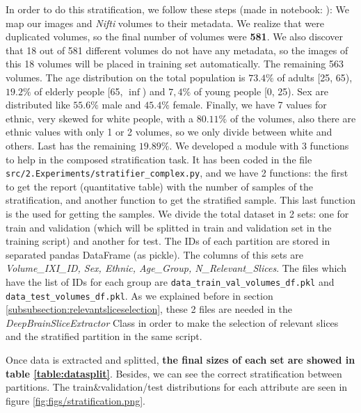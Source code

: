 In order to do this stratification, we follow these steps (made in notebook: ): We map our images and \textit{Nifti} volumes to their metadata. We realize that were duplicated volumes, so the final number of volumes were \textbf{581}. We also discover that 18 out of 581 different volumes do not have any metadata, so the images of this 18 volumes will be placed in training set automatically. The remaining 563 volumes. The age distribution on the total population is $73.4\%$ of adults [25, 65), $19.2\%$ of elderly people [65, $\inf$) and $7,4\%$ of young people [0, 25). Sex are distributed like $55.6\%$ male and $45.4\%$ female. Finally, we have 7 values for ethnic, very skewed for white people, with a $80.11\%$ of the volumes, also there are ethnic values with only 1 or 2 volumes, so we only divide between white and others. Last has the remaining $19.89\%$. We developed a module with 3 functions to help in the composed stratification task. It has been coded in the file \texttt{\-src/\-2.Ex\-perim\-ents\-/strati\-fier\-\_complex.py}, and we have 2 functions: the first to get the report (quantitative table) with the number of samples of the stratification, and another function to get the stratified sample. This last function is the used for getting the samples. We divide the total dataset in 2 sets: one for train and validation (which will be splitted in train and validation set in the training script) and another for test. The IDs of each partition are stored in separated pandas DataFrame (as pickle). The columns of this sets are \textit{Volume\_IXI\_ID, Sex, Ethnic, Age\_Group, N\_Relevant\_Slices}. The files which have the list of IDs for each group are \texttt{data\-\_train\-\_val\-\_volumes\-\_df.pkl} and \texttt{data\-\_test\-\_volumes\-\_df.pkl}. As we explained before in section \ref{subsubsection:relevantsliceselection}, these 2 files are needed in the \textit{DeepBrainSliceExtractor} Class in order to make the selection of relevant slices and the stratified partition in the same script. 

Once data is extracted and splitted, \textbf{the final sizes of each set are showed in table \ref{table:datasplit}}. Besides, we can see the correct stratification between partitions. The train\&validation/test distributions for each attribute are seen in figure \ref{fig:figs/stratification.png}.


